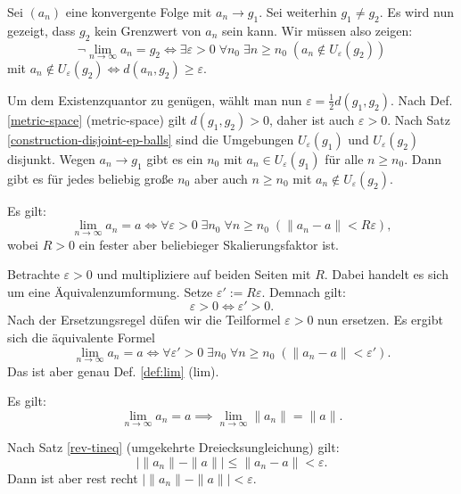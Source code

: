 \begin{Beweis}
Sei $(a_n)$ eine konvergente Folge mit $a_n\to g_1$. Sei weiterhin
$g_1\ne g_2$. Es wird nun gezeigt, dass $g_2$ kein Grenzwert von $a_n$
sein kann. Wir müssen also zeigen:
\[\neg\lim_{n\to\infty} a_n=g_2 \iff
\exists\varepsilon{>}0\;\forall n_0\;\exists n{\ge}n_0\;
(a_n\notin U_\varepsilon(g_2))\]
mit $a_n\notin U_\varepsilon(g_2)\iff d(a_n,g_2)\ge\varepsilon$.

Um dem Existenzquantor zu genügen, wählt man nun
$\varepsilon = \frac{1}{2}d(g_1,g_2)$.
Nach Def. \ref{metric-space} (metric-space) gilt 
$d(g_1,g_2)>0$, daher ist auch $\varepsilon>0$. Nach Satz
\ref{construction-disjoint-ep-balls} sind die Umgebungen
$U_\varepsilon(g_1)$ und $U_\varepsilon(g_2)$ disjunkt.
Wegen $a_n\to g_1$ gibt es ein $n_0$ mit $a_n\in U_\varepsilon(g_1)$ für alle
$n\ge n_0$. Dann gibt es für jedes beliebig große $n_0$ aber auch
$n\ge n_0$ mit $a_n\notin U_\varepsilon(g_2)$.\,\qedsymbol
\end{Beweis}

\begin{Satz}\label{lim-scaled-ep}
Es gilt:
\[\lim_{n\to\infty} a_n=a \iff
\forall\varepsilon{>}0\;\exists n_0\;\forall n{\ge}n_0\;(\|a_n-a\|<R\varepsilon),\]
wobei $R>0$ ein fester aber beliebieger Skalierungsfaktor ist.
\end{Satz}

\begin{Beweis}
Betrachte $\varepsilon>0$ und multipliziere auf beiden Seiten
mit $R$. Dabei handelt es sich um eine Äquivalenzumformung.
Setze $\varepsilon':=R\varepsilon$. Demnach gilt:
\[\varepsilon>0 \iff \varepsilon'>0.\]
Nach der Ersetzungsregel düfen wir die Teilformel $\varepsilon>0$
nun ersetzen. Es ergibt sich die äquivalente Formel
\[\lim_{n\to\infty} a_n=a \iff
\forall\varepsilon'{>}0\;\exists n_0\;\forall n{\ge}n_0\;
(\|a_n-a\|<\varepsilon').\]
Das ist aber genau Def. \ref{def:lim} (lim).\,\qedsymbol
\end{Beweis}

\begin{Satz}
Es gilt:
\[\lim_{n\to\infty} a_n = a\implies \lim_{n\to\infty} \|a_n\| = \|a\|.\]
\end{Satz}

\begin{Beweis}
Nach Satz \ref{rev-tineq} (umgekehrte Dreiecksungleichung) gilt:
\[|\|a_n\|-\|a\|| \le \|a_n-a\| < \varepsilon.\]
Dann ist aber rest recht $|\|a_n\|-\|a\||<\varepsilon$.\,\qedsymbol
\end{Beweis}

